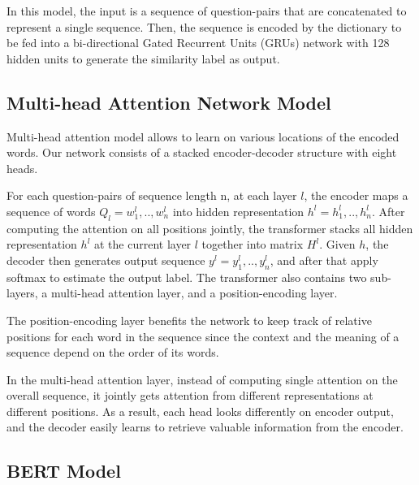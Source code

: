 \documentclass[11pt,a4paper]{article}
\begin{document}
In this model, the input is a sequence of question-pairs that are concatenated to represent a single sequence. Then, the sequence is encoded by the dictionary to be fed into a bi-directional Gated Recurrent Units (GRUs) network with 128 hidden units to generate the similarity label as output. 

\vspace{0.4pt}
 \subsection{Multi-head Attention Network Model}
Multi-head attention model \cite{vaswani2017attention} allows to learn on various locations of the encoded words. Our network consists of a stacked encoder-decoder structure with eight heads. 

For each question-pairs of sequence length n, at each layer $l$, the encoder maps a sequence of words $ Q_l={w_1^l,..,w_n^l} $ into hidden representation $h^l={h_1^l,..,h_n^l}$. After computing the  attention on all positions jointly, the transformer stacks all hidden representation $h^l$ at the current layer $l$ together into matrix $H^l$.  Given $h$, the decoder then generates output sequence $ y^l={y_1^l,..,y_n^l} $, and after that apply softmax to estimate the output label. 
The transformer also contains two sub-layers, a multi-head attention layer, and a position-encoding layer.

The position-encoding layer benefits the network to keep track of relative positions for each word in the sequence since the context and the meaning of a sequence depend on the order of its words. 

In the multi-head attention layer, instead of computing single attention on the overall sequence, it jointly gets attention from different representations at different positions. As a result, each head looks differently on encoder output, and the decoder easily learns to retrieve valuable information from the encoder.




\vspace{0.4pt}
\subsection{BERT Model}
\end{document}
